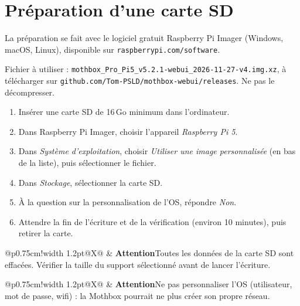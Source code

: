 \documentclass[10pt,a4paper]{article}
\makeatletter
\newcommand{\avert}[2]{%
  \par\smallskip\noindent
  \begin{tabularx}{\linewidth}{@{}p{0.75cm}!{\color{black}\vrule width 1.2pt}@{\hspace{6pt}}X@{}}
  \raisebox{-2pt}{\Large\faExclamationTriangle} & \textbf{#1}\quad #2
  \end{tabularx}\par\smallskip}
\makeatother
\begin{document}
\newpage
\begin{minipage}[t]{0.52\textwidth}
\vspace{0pt}
\section{Préparation d'une carte SD}
La préparation se fait avec le logiciel gratuit Raspberry Pi Imager (Windows, macOS, Linux), disponible sur \texttt{raspberrypi.com/software}.

Fichier à utiliser : \texttt{mothbox\_Pro\_Pi5\_v5.2.1-webui\_2026-11-27-v4.img.xz}, à télécharger sur \texttt{github.com/Tom-PSLD/mothbox-webui/releases}. Ne pas le décompresser.
\begin{enumerate}
  \item Insérer une carte SD de 16\,Go minimum dans l'ordinateur.
  \item Dans Raspberry Pi Imager, choisir l'appareil \emph{Raspberry Pi 5}.
  \item Dans \emph{Système d'exploitation}, choisir \emph{Utiliser une image personnalisée} (en bas de la liste), puis sélectionner le fichier.
  \item Dans \emph{Stockage}, sélectionner la carte SD.
  \item À la question sur la personnalisation de l'OS, répondre \emph{Non}.
  \item Attendre la fin de l'écriture et de la vérification (environ 10 minutes), puis retirer la carte.
\end{enumerate}
\avert{Attention}{Toutes les données de la carte SD sont effacées. Vérifier la taille du support sélectionné avant de lancer l'écriture.}
\avert{Attention}{Ne pas personnaliser l'OS (utilisateur, mot de passe, wifi) : la Mothbox pourrait ne plus créer son propre réseau.}
\end{minipage}\hfill
\end{document}
